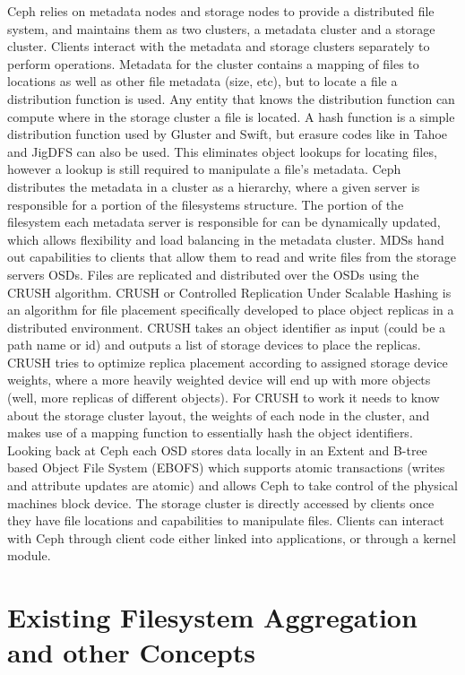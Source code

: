 Ceph \cite{Weil2006} relies on metadata nodes and storage nodes to provide a
distributed file system, and maintains them as two clusters, a metadata
cluster and a storage cluster. Clients interact with the metadata and storage
clusters separately to perform operations. Metadata for the cluster contains a
mapping of files to locations as well as other file metadata (size, etc), but
to locate a file a distribution function is used. Any entity that knows the
distribution function can compute where in the storage cluster a file is
located. A hash function is a simple distribution function used by Gluster and
Swift, but erasure codes like in Tahoe and JigDFS can also be used. This
eliminates object lookups for locating files, however a lookup is still
required to manipulate a file's metadata. Ceph distributes the metadata in a
cluster as a hierarchy, where a given server is responsible for a portion of
the filesystems structure. The portion of the filesystem each metadata server
is responsible for can be dynamically updated, which allows flexibility and
load balancing in the metadata cluster. MDSs hand out capabilities to clients
that allow them to read and write files from the storage servers OSDs. Files
are replicated and distributed over the OSDs using the CRUSH algorithm. CRUSH
or Controlled Replication Under Scalable Hashing \cite{Weil2006a} is an
algorithm for file placement specifically developed to place object replicas
in a distributed environment. CRUSH takes an object identifier as input (could
be a path name or id) and outputs a list of storage devices to place the
replicas. CRUSH tries to optimize replica placement according to assigned
storage device weights, where a more heavily weighted device will end up with
more objects (well, more replicas of different objects). For CRUSH to work it
needs to know about the storage cluster layout, the weights of each node in
the cluster, and makes use of a mapping function to essentially hash the
object identifiers. Looking back at Ceph each OSD stores data locally in an
Extent and B-tree based Object File System (EBOFS) which supports atomic
transactions (writes and attribute updates are atomic) and allows Ceph to take
control of the physical machines block device. The storage cluster is directly
accessed by clients once they have file locations and capabilities to
manipulate files. Clients can interact with Ceph through client code either
linked into applications, or through a kernel module.


\section{Existing Filesystem Aggregation and other Concepts}

